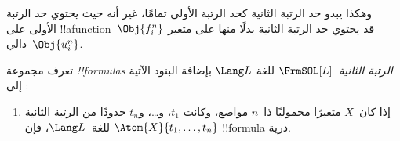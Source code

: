\documentclass[../../../include/open-logic-section]{subfiles}
\begin{document}
\begin{explain}
وهكذا يبدو حد الرتبة الثانية كحد الرتبة الأولى تمامًا، غير أنه حيث
يحتوي حد الرتبة الأولى على !!a{function}~$\Obj{f^n_i}$ قد يحتوي حد
الرتبة الثانية بدلًا منها على متغير دالي~$\Obj{u^n_i}$.
\end{explain}

\begin{defn}
تعرف مجموعة \emph{!!{formula}s الرتبة الثانية}~$\FrmSOL[L]$ للغة
$\Lang L$ بإضافة البنود الآتية إلى
:
\begin{enumerate}
\item إذا كان~$X$ متغيرًا محموليًا ذا~$n$ مواضع، وكانت
$t_1$، و\dots، و$t_n$ حدودًا من الرتبة الثانية للغة~$\Lang L$، فإن
$\Atom{X}{t_1,\ldots, t_n}$ !!{formula} ذرية.




\end{enumerate}
\end{defn}
\end{document}
